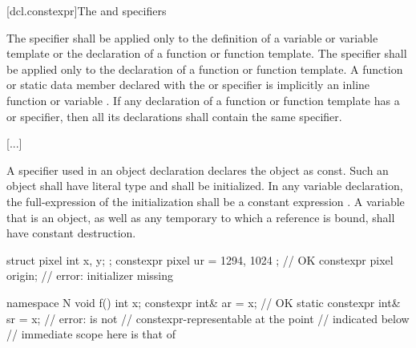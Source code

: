 \documentclass{wg21}
\begin{document}
[dcl.constexpr]{The  and  specifiers}%


\pnum
The  specifier shall be applied only to
the definition of a variable or variable template or
the declaration of a function or function template.
The  specifier shall be applied only to
the declaration of a function or function template.
A function or static data member
declared with the  or  specifier
is implicitly an inline function or variable .
If any declaration of a function or function template has
a  or  specifier,
then all its declarations shall contain the same specifier.

[...]


\pnum
A  specifier used in an object declaration
declares the object as const.
Such an object
shall have literal type and
shall be initialized.
In any  variable declaration,
the full-expression of the initialization
shall be a constant expression .
A  variable that is an object,
as well as any temporary to which a  reference is bound,
shall have constant destruction.

\begin{example}
\begin{codeblock}
struct pixel {
    int x, y;
};
constexpr pixel ur = { 1294, 1024 };    // OK
constexpr pixel origin;                 // error: initializer missing
\end{codeblock}
\begin{addedblock}
\begin{codeblock}
namespace N {
void f() {
    int x;
    constexpr int& ar = x;         // OK
    static constexpr int& sr = x;  // error:  is not
                                   // constexpr-representable at the point
                                   // indicated below
}
// immediate scope here is that of 
}
\end{codeblock}
\end{addedblock}
\end{example}
\end{document}
